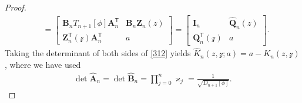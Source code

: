 \documentclass[10pt,a4paper]{amsart}
\numberwithin{equation}{section}
\begin{document}
\begin{proof}
\begin{align}
& = \begin{bmatrix}
						\boldsymbol{B}_{n} T_{n+1}[\phi] \boldsymbol{A}^{\mathsf T}_{n} & \boldsymbol{B}_{n} \boldsymbol{Z}_{n}(z) \\
						\boldsymbol{Z}^{\mathsf T}_{n}(\mathcal{z}) \boldsymbol{A}^{\mathsf T}_{n} & a
					\end{bmatrix} = \begin{bmatrix}
						\boldsymbol{I}_{n}	 & \boldsymbol{\widehat{Q}}_n(z) \\
						\boldsymbol{Q}^{\mathsf T}_n(\mathcal{z}) & a
					\end{bmatrix}.\label{312}
			\end{align}
			Taking the determinant of both sides of \eqref{312} yields $\widehat{K}_{n}(z,\mathcal{z};a) = a - K_{n}(z,\mathcal{z})$, where we
			have used \begin{gather*}
				\det \boldsymbol{\widehat{A}}_{n} = \det 	\boldsymbol{\widehat{B}}_{n} = \prod_{j=0}^{n} \varkappa_j = \frac{1}{\sqrt{D_{n+1}[\phi]}}.\tag*{\qed}
			\end{gather*}		\renewcommand{\qed}{}
		\end{proof}
\end{document}
